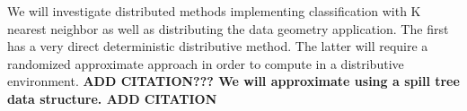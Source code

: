 \vspace{5 mm}
\noindent
We will investigate distributed methods implementing classification with 
K nearest neighbor as well as distributing the data geometry application. The 
first has a very direct deterministic distributive method. The latter will 
require a randomized approximate approach in order to compute in a distributive 
environment.
\bf{ADD CITATION???} 
We will approximate using a spill tree data structure.
\bf{ADD CITATION}